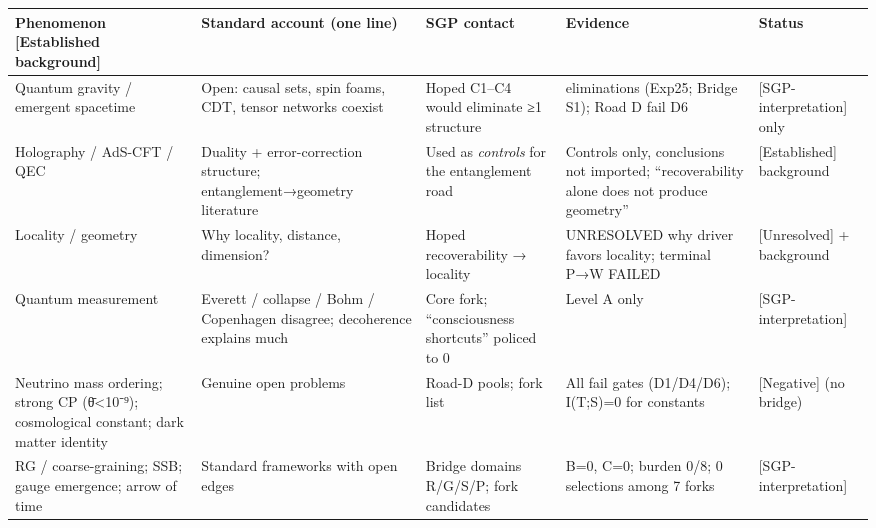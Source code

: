 \documentclass[
  11pt,
]{book}
\begin{document}
\begin{longtable}[]{@{}
  >{\raggedright\arraybackslash}p{}
  >{\raggedright\arraybackslash}p{}
  >{\raggedright\arraybackslash}p{}
  >{\raggedright\arraybackslash}p{}
  >{\raggedright\arraybackslash}p{}@{}}
\toprule\noalign{}
\begin{minipage}[b]{\linewidth}\raggedright
Phenomenon {[}Established background{]}
\end{minipage} & \begin{minipage}[b]{\linewidth}\raggedright
Standard account (one line)
\end{minipage} & \begin{minipage}[b]{\linewidth}\raggedright
SGP contact
\end{minipage} & \begin{minipage}[b]{\linewidth}\raggedright
Evidence
\end{minipage} & \begin{minipage}[b]{\linewidth}\raggedright
Status
\end{minipage} \\
\midrule\noalign{}
\endhead
\bottomrule\noalign{}
\endlastfoot
Quantum gravity / emergent spacetime & Open: causal sets, spin foams,
CDT, tensor networks coexist & Hoped C1--C4 would eliminate ≥1 structure
& 0 eliminations (Exp25; Bridge S1); Road D fail D6 &
{[}SGP-interpretation{]} only \\
Holography / AdS-CFT / QEC & Duality + error-correction structure;
entanglement→geometry literature & Used as \emph{controls} for the
entanglement road & Controls only, conclusions not imported;
``recoverability alone does not produce geometry'' & {[}Established{]}
background \\
Locality / geometry & Why locality, distance, dimension? & Hoped
recoverability → locality & UNRESOLVED why driver favors locality;
terminal P→W FAILED & {[}Unresolved{]} + background \\
Quantum measurement & Everett / collapse / Bohm / Copenhagen disagree;
decoherence explains much & Core fork; ``consciousness shortcuts''
policed to 0 & Level A only & {[}SGP-interpretation{]} \\
Neutrino mass ordering; strong CP (θ̄\textless10⁻⁹); cosmological
constant; dark matter identity & Genuine open problems & Road-D pools;
fork list & All fail gates (D1/D4/D6); I(T;S)=0 for constants &
{[}Negative{]} (no bridge) \\
RG / coarse-graining; SSB; gauge emergence; arrow of time & Standard
frameworks with open edges & Bridge domains R/G/S/P; fork candidates &
B=0, C=0; burden 0/8; 0 selections among 7 forks &
{[}SGP-interpretation{]} \\
\end{longtable}
\end{document}
